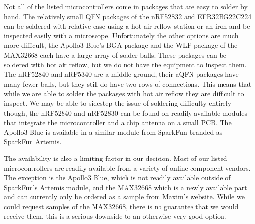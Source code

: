Not all of the listed microcontrollers come in packages that are easy to solder
by hand. The relatively small QFN packages of the nRF52832 and EFR32BG22C224 can
be soldered with relative ease using a hot air reflow station or an iron and be
inspected easily with a microscope. Unfortunately the other options are much
more difficult, the Apollo3 Blue's BGA package and the WLP package of the
MAX32668 each have a large array of solder balls. These packages can be soldered
with hot air reflow, but we do not have the equipment to inspect them. The
nRF52840 and nRF5340 are a middle ground, their aQFN packages have many fewer
balls, but they still do have two rows of connections. This means that while we
are able to solder the packages with hot air reflow they are difficult to
inspect. We may be able to sidestep the issue of soldering difficulty entirely
though, the nRF52840 and nRF52830 can be found on readily available modules that
integrate the microcontroller and a chip antenna on a small PCB. The Apollo3
Blue is available in a similar module from SparkFun branded as SparkFun Artemis.

The availability is also a limiting factor in our decision. Most of our listed
microcontrollers are readily available from a variety of online component
vendors. The exception is the Apollo3 Blue, which is not readily available
outside of SparkFun's Artemis module, and the MAX32668 which is a newly
available part and can currently only be ordered as a sample from Maxim's
website. While we could request samples of the MAX32668, there is no guarantee
that we would receive them, this is a serious downside to an otherwise very
good option.

